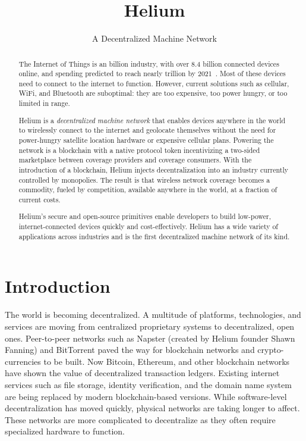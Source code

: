 \documentclass[UTF8, 10pt, nonatbib, nocopyrightspace, reprint]{sigplanconf}
\begin{document}
\setlength{\pdfpageheight}{\paperheight}
\setlength{\pdfpagewidth}{\paperwidth}

\title{Helium}
\subtitle{A Decentralized Machine Network}

\maketitle

\begin{abstract}
The Internet of Things is an  billion industry, with over 8.4 billion connected devices online, and spending predicted to reach nearly  trillion by 2021~\cite{idc}. Most of these devices need to connect to the internet to function. However, current solutions such as cellular, WiFi, and Bluetooth are suboptimal: they are too expensive, too power hungry, or too limited in range.

Helium is a \emph{decentralized machine network} that enables devices anywhere in the world to wirelessly connect to the internet and geolocate themselves without the need for power-hungry satellite location hardware or expensive cellular plans. Powering the network is a blockchain with a native protocol token incentivizing a two-sided marketplace between coverage providers and coverage consumers. With the introduction of a blockchain, Helium injects decentralization into an industry currently controlled by monopolies. The result is that wireless network coverage becomes a commodity, fueled by competition, available anywhere in the world, at a fraction of current costs.

Helium's secure and open-source primitives enable developers to build low-power, internet-connected devices quickly and cost-effectively. Helium has a wide variety of applications across industries and is the first decentralized machine network of its kind.
\end{abstract}



\section{Introduction}

The world is becoming decentralized. A multitude of platforms, technologies, and services are moving from centralized proprietary systems to decentralized, open ones. Peer-to-peer networks such as Napster (created by Helium founder Shawn Fanning) \cite{napster} and BitTorrent paved the way for blockchain networks and crypto-currencies to be built. Now Bitcoin, Ethereum, and other blockchain networks have shown the value of decentralized transaction ledgers. Existing internet services such as file storage, identity verification, and the domain name system are being replaced by modern blockchain-based versions. While software-level decentralization has moved quickly, physical networks are taking longer to affect. These networks are more complicated to decentralize as they often require specialized hardware to function.
\end{document}
